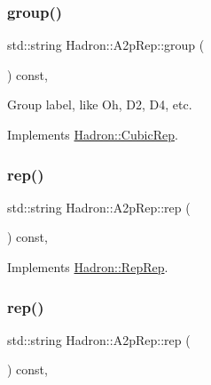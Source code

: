 \subsubsection{\texorpdfstring{group()}{group()}\hspace{0.1cm}{\footnotesize\ttfamily [3/3]}}
{\footnotesize\ttfamily std\+::string Hadron\+::\+A2p\+Rep\+::group (\begin{DoxyParamCaption}{ }\end{DoxyParamCaption}) const\hspace{0.3cm}{\ttfamily [inline]}, {\ttfamily [virtual]}}

Group label, like Oh, D2, D4, etc. 

Implements \mbox{\hyperlink{structHadron_1_1CubicRep_a0748f11ec87f387062c8e8981339a29c}{Hadron\+::\+Cubic\+Rep}}.

\mbox{\label{structHadron_1_1A2pRep_a3ced5497d56bb36345560c2e3cb3d2e7}} 
\subsubsection{\texorpdfstring{rep()}{rep()}\hspace{0.1cm}{\footnotesize\ttfamily [1/5]}}
{\footnotesize\ttfamily std\+::string Hadron\+::\+A2p\+Rep\+::rep (\begin{DoxyParamCaption}{ }\end{DoxyParamCaption}) const\hspace{0.3cm}{\ttfamily [inline]}, {\ttfamily [virtual]}}



Implements \mbox{\hyperlink{structHadron_1_1RepRep_ab3213025f6de249f7095892109575fde}{Hadron\+::\+Rep\+Rep}}.

\mbox{\label{structHadron_1_1A2pRep_a3ced5497d56bb36345560c2e3cb3d2e7}} 
\subsubsection{\texorpdfstring{rep()}{rep()}\hspace{0.1cm}{\footnotesize\ttfamily [2/5]}}
{\footnotesize\ttfamily std\+::string Hadron\+::\+A2p\+Rep\+::rep (\begin{DoxyParamCaption}{ }\end{DoxyParamCaption}) const\hspace{0.3cm}{\ttfamily [inline]}, {\ttfamily [virtual]}}



